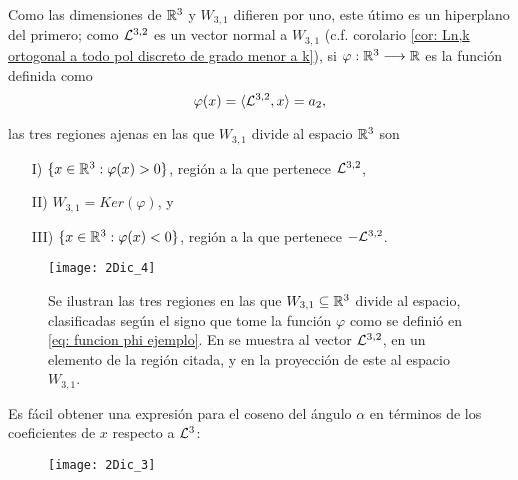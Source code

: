 \begin{ejemplo}
\begin{itemize}
Como las dimensiones de $\mathbb{R}^{3}$ y $W_{3,1}$ 
difieren por uno,
este útimo es un hiperplano
del primero; como $\mathcal{L}^{3,2}$
es un vector normal a $W_{3,1}$
(c.f. corolario \ref{cor: Ln,k ortogonal a todo pol discreto de grado menor a k}), 
si $\varphi: \mathbb{R}^{3} \longrightarrow \mathbb{R}$ es la función
definida como
\begin{equation}
\label{eq: funcion phi ejemplo}
\varphi(x)= \langle \mathcal{L}^{3,2} , x \rangle =a_{2},
\end{equation}



las tres regiones ajenas en las
que $W_{3,1}$ divide al espacio
$\mathbb{R}^{3}$ son 


\begin{itemize}
\item[I)] $\{ x \in \mathbb{R}^{3} : \varphi(x)>0 \}$,
región a la que pertenece $\mathcal{L}^{3,2}$,
\item[II)] $W_{3,1}= Ker(\varphi)$, y 
\item[III)] $\{ x \in \mathbb{R}^{3} : \varphi(x)<0 \}$,
región a la que pertenece $-\mathcal{L}^{3,2}$.
\end{itemize}



\begin{figure}[H]
\centering\captionsetup{format = hang}
	\begin{measuredfigure}
		\texttt{[image: 2Dic\_4]} 
		\caption{Se ilustran las tres 
		regiones en las que $W_{3,1} \subseteq \mathbb{R}^{3}$ divide al espacio,
		clasificadas según el signo que tome 
		la función $\varphi$ como se definió en
		\eqref{eq: funcion phi ejemplo}. En
		{\color{ameDorado}{dorado}} se muestra al vector
		$\mathcal{L}^{3,2}$, en {\color{ameRosa}{rosa}}
		un elemento de la región citada, y en 
		{\color{ameMorado}{morado}} la proyección de este
		al espacio $W_{3,1}$.
		}
 	\end{measuredfigure}
 \end{figure}

Es fácil obtener una expresión para el coseno del ángulo
$\alpha$ en términos de los coeficientes de $x$ respecto a $\mathcal{L}^{3}$:

\begin{figure}[H]
\centering\captionsetup{format = hang}
	\begin{measuredfigure}
		\texttt{[image: 2Dic\_3]} 
		\caption{\TODO{por qué ese ángulo era recto?}}
 	\end{measuredfigure}
 \end{figure}


\end{itemize}
\end{ejemplo}
